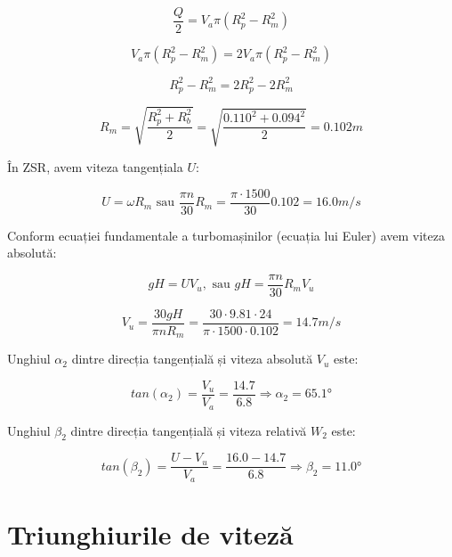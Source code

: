 \begin{equation}
\frac{Q}{2} = V_a \pi (R_p^2 - R_m^2) 
\end{equation}

\begin{equation}
V_a \pi (R_p^2 - R_m^2) = 2 V_a \pi (R_p^2 - R_m^2) 
\end{equation}

\begin{equation}
R_p^2 - R_m^2 = 2 R_p^2 - 2 R_m^2
\end{equation}

\begin{equation}
R_m = \sqrt{\frac{R_p^2 + R_b^2}{2}} = \sqrt{\frac{0.110^2 + 0.094^2}{2}} = 0.102\si{m}
\end{equation}

În ZSR, avem viteza tangențiala $U$:

\begin{equation}
U = \omega R_m \text{ sau } \frac{\pi n}{30} R_m = \frac{\pi \cdot 1500}{30} 0.102 = 16.0 \si{m/s}
\end{equation}

Conform ecuației fundamentale a turbomașinilor (ecuația lui Euler) avem viteza absolută:

\begin{equation}
gH=UV_{u}, \text{ sau } gH=\frac{\pi n}{30} R_m V_{u}
\end{equation}

\begin{equation}
V_{u} = \frac{30gH}{\pi n R_m} = \frac{30 \cdot 9.81 \cdot 24 }{\pi \cdot 1500 \cdot 0.102} = 14.7 \si{m/s}
\end{equation}


Unghiul $\alpha_2$ dintre direcția tangențială și viteza absolută $V_u$ este:

\begin{equation}
tan(\alpha_{2 })=\frac{V_{u}}{V_{a}} = \frac{14.7}{6.8} \Rightarrow \alpha_{2}=65.1\si{\degree}
\end{equation}


Unghiul $\beta_2$ dintre direcția tangențială și viteza relativă $W_2$ este:

\begin{equation}
tan(\beta_{2})=\frac{U - V_u}{V_a} = \frac{16.0 - 14.7}{6.8} \Rightarrow \beta_{2} =11.0\si{\degree}
\end{equation}


\section{Triunghiurile de viteză}

